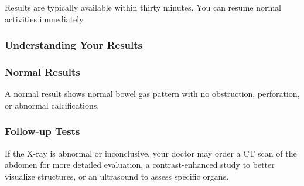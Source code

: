Results are typically available within thirty minutes. You can resume normal activities immediately.

\subsubsection*{Understanding Your Results}

\subsubsection*{Normal Results}
A normal result shows normal bowel gas pattern with no obstruction, perforation, or abnormal calcifications.

\subsubsection*{Follow-up Tests}
If the X-ray is abnormal or inconclusive, your doctor may order a CT scan of the abdomen for more detailed evaluation, a contrast-enhanced study to better visualize structures, or an ultrasound to assess specific organs.
\clearpage
